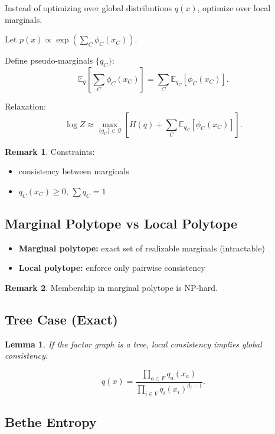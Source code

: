 \documentclass[12pt,oneside]{book}
\numberwithin{equation}{section}
\theoremstyle{definition}
\newtheorem{remark}{Remark}[section]
\theoremstyle{plain}
\newtheorem{lemma}{Lemma}[section]
\theoremstyle{remark}
\newcommand{\E}{\mathbb{E}}
\begin{document}
Instead of optimizing over global distributions $q(x)$, optimize over local marginals.

Let $p(x) \propto \exp\left(\sum_{C} \phi_C(x_C)\right)$.

Define pseudo-marginals $\{q_C\}$:
\[
\E_q\left[\sum_C \phi_C(x_C)\right]
=
\sum_C \E_{q_C}[\phi_C(x_C)].
\]

Relaxation:
\[
\log Z
\approx
\max_{\{q_C\} \in \mathcal{Q}}
\left[
H(q) + \sum_C \E_{q_C}[\phi_C(x_C)]
\right].
\]

\begin{remark}
Constraints:
\begin{itemize}
    \item consistency between marginals
    \item $q_C(x_C) \ge 0$, $\sum q_C = 1$
\end{itemize}
\end{remark}

\subsection{Marginal Polytope vs Local Polytope}

\begin{itemize}
    \item \textbf{Marginal polytope:} exact set of realizable marginals (intractable)
    \item \textbf{Local polytope:} enforce only pairwise consistency
\end{itemize}

\begin{remark}
Membership in marginal polytope is NP-hard.
\end{remark}

\subsection{Tree Case (Exact)}

\begin{lemma}
If the factor graph is a tree, local consistency implies global consistency.
\end{lemma}

\[
q(x)
=
\frac{\prod_{a \in F} q_a(x_a)}{\prod_{i \in V} q_i(x_i)^{d_i-1}}.
\]

\subsection{Bethe Entropy}
\end{document}
